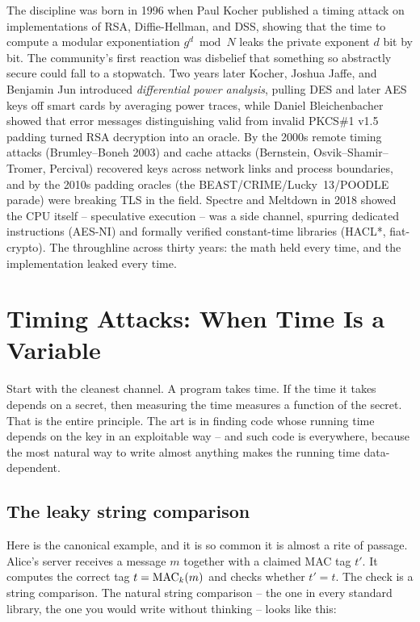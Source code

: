 \begin{historybox}
The discipline was born in 1996 when Paul Kocher published a timing attack on implementations of RSA, Diffie-Hellman, and DSS, showing that the time to compute a modular exponentiation $g^{d} \bmod N$ leaks the private exponent $d$ bit by bit. The community's first reaction was disbelief that something so abstractly secure could fall to a stopwatch. Two years later Kocher, Joshua Jaffe, and Benjamin Jun introduced \emph{differential power analysis}, pulling DES and later AES keys off smart cards by averaging power traces, while Daniel Bleichenbacher showed that error messages distinguishing valid from invalid PKCS\#1 v1.5 padding turned RSA decryption into an oracle. By the 2000s remote timing attacks (Brumley--Boneh 2003) and cache attacks (Bernstein, Osvik--Shamir--Tromer, Percival) recovered keys across network links and process boundaries, and by the 2010s padding oracles (the BEAST/CRIME/Lucky~13/POODLE parade) were breaking TLS in the field. Spectre and Meltdown in 2018 showed the CPU itself -- speculative execution -- was a side channel, spurring dedicated instructions (AES-NI) and formally verified constant-time libraries (HACL*, fiat-crypto). The throughline across thirty years: the math held every time, and the implementation leaked every time.
\end{historybox}

\section{Timing Attacks: When Time Is a Variable}
\label{ch37:timing}

Start with the cleanest channel. A program takes time. If the time it takes depends on a secret, then measuring the time measures a function of the secret. That is the entire principle. The art is in finding code whose running time depends on the key in an exploitable way -- and such code is everywhere, because the most natural way to write almost anything makes the running time data-dependent.

\subsection{The leaky string comparison}
\label{ch37:strcmp}

Here is the canonical example, and it is so common it is almost a rite of passage. Alice's server receives a message $m$ together with a claimed MAC tag $t'$. It computes the correct tag $t = \operatorname{MAC}_k(m)$ and checks whether $t' = t$. The check is a string comparison. The natural string comparison -- the one in every standard library, the one you would write without thinking -- looks like this:

